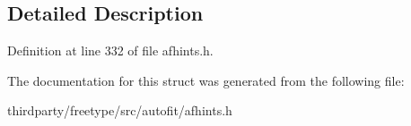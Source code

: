 \begin{DoxyCompactItemize}
\begin{tabbing}
\end{tabbing}\end{DoxyCompactItemize}


\subsection{Detailed Description}


Definition at line 332 of file afhints.\+h.



The documentation for this struct was generated from the following file\+:\begin{DoxyCompactItemize}
\item 
thirdparty/freetype/src/autofit/afhints.\+h\end{DoxyCompactItemize}
